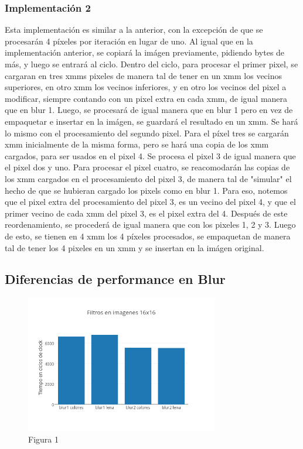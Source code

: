 \documentclass[a4paper]{article}
\begin{document}
\subsubsection{Implementación 2}

Esta implementación es similar a la anterior, con la excepción de que se procesarán 4 píxeles por iteración en lugar de uno. Al igual que en la implementación anterior, se copiará la imágen previamente, pidiendo bytes de más, y luego se entrará al ciclo. Dentro del ciclo, para procesar el primer pixel, se cargaran en tres xmms pixeles de manera tal de tener en un xmm los vecinos superiores, en otro xmm los vecinos inferiores, y en otro los vecinos del pixel a modificar, siempre contando con un pixel extra en cada xmm, de igual manera que en blur 1. Luego, se procesará de igual manera que en blur 1 pero en vez de empaquetar e insertar en la imágen, se guardará el resultado en un xmm. Se hará lo mismo con el procesamiento del segundo pixel. Para el píxel tres se cargarán xmm inicialmente de la misma forma, pero se hará una copia de los xmm cargados, para ser usados en el pixel 4. Se procesa el pixel 3 de igual manera que el pixel dos y uno. Para procesar el pixel cuatro, se reacomodarán las copias de los xmm cargados en el procesamiento del pixel 3, de manera tal de "simular" el hecho de que se hubieran cargado los pixels como en blur 1. Para eso, notemos que el pixel extra del procesamiento del pixel 3, es un vecino del pixel 4, y que el primer vecino de cada xmm del pixel 3, es el pixel extra del 4. Después de este reordenamiento, se procederá de igual manera que con los pixeles 1, 2 y 3.
Luego de esto, se tienen en 4 xmm los 4 píxeles procesados, se empaquetan de manera tal de tener los 4 pixeles en un xmm y se insertan en la imágen original.

\subsection{Diferencias de performance en Blur}

\begin{figure}[h]
  \centering
    \includegraphics[width=0.75\textwidth]{imagenes/Filtros blur en imagenes 16x16.png}
  \caption{Figura 1}
  \label{fig:graficoblur1}
\end{figure}
 \FloatBarrier
\end{document}
